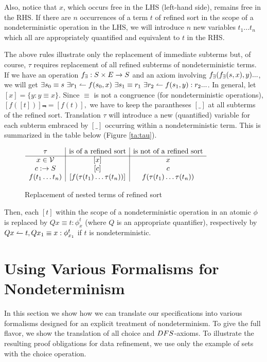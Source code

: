 Also, notice that $x$, which occurs free in the LHS (left-hand side), remains free in the RHS. If there are $n$ occurrences of a term $t$ of refined sort in the scope of a nondeterministic operation in the LHS, we will introduce $n$ new variables $t_1...t_n$ which all are appropriately quantified and equivalent to $t$ in the RHS. 

The above rules illustrate only the replacement of immediate subterms but, of course, $\tau$
requires replacement of all refined subterms of nondeterministic terms. If we have an operation $f_\exists:S\times E\rightarrow S$ and an axiom involving $f_\exists(f_\exists(s,x),y)...$, we will get $\exists s_0\equiv s\ \exists r_1\isres f(s_0,x)\ \exists s_1\equiv r_1\ \exists r_2\isres f(s_1,y):r_2...$. In general, let $[x]=\{y:y\equiv x\}$. Since $\equiv$ is not a congruence (for nondeterministic
operations), $[f([t])]\Not=[f(t)],$ we have to keep the parantheses $[\_]$ at all subterms of the refined sort. Translation $\tau$ will introduce a new (quantified) variable for each subterm embraced by $[\_]$ occurring within a nondeterministic term.
This is summarized in the table below (Figure \ref{ta:tau}). %
\begin{figure}[hbt]
\centering
\( \begin{array}{c|c|c}
\tau & $is of a refined sort$ & $is not of a refined sort$ \\ \cline{1-3} x\in {\cal V}	& [x]	& x \\
c:\into S	& [c]	& c \\
f(t_1\ldots t_n) & [f(\tau(t_1)\ldots\tau(t_n))] & f(\tau(t_1)\ldots\tau(t_n))
\end{array} \) \caption{Replacement of nested terms of refined sort} \label{ta:tau}\label{'tabela'}
\end{figure}
Then, each $[t]$ within the scope of a nondeterministic operation in an atomic
$\phi$ is replaced by $Q x\equiv t : \phi_x^t$ (where $Q$ is an appropriate quantifier), respectively by $Q x\leftharpoonup t,Q x_1\equiv x: \phi_{x_{1}}^t$ if $t$ is nondeterministic. 

\section{Using Various Formalisms for Nondeterminism}\label{se:various} In this section we show how we can translate our specifications into various formalisms designed for
an explicit treatment of nondeterminism. To give the full flavor, we show the
translation of all choice and $DFS$-axioms. To illustrate the resulting proof obligations for data refinement, we use only the example of sets with the choice operation.

